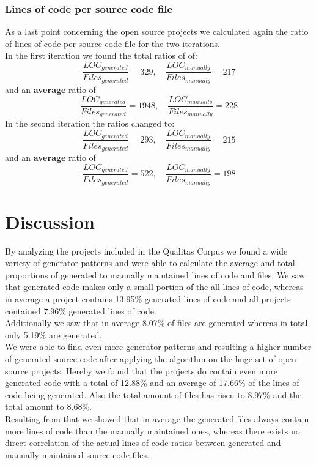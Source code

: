 \subsubsection{Lines of code per source code file}
As a last point concerning the open source projects we calculated again the ratio of lines of code per source code file for the two iterations.\\
In the first iteration we found the total ratios of of:
\begin{equation}
	\frac{LOC_{generated}}{Files_{generated}} = 329 , \quad \frac{LOC_{manually}}{Files_{manually}} = 217
\end{equation}
and an \textbf{average} ratio of
\begin{equation}
	\frac{LOC_{generated}}{Files_{generated}} = 1948 , \quad \frac{LOC_{manually}}{Files_{manually}} = 228
\end{equation}
In the second iteration the ratios changed to:
\begin{equation}
\frac{LOC_{generated}}{Files_{generated}} = 293 , \quad \frac{LOC_{manually}}{Files_{manually}} = 215
\end{equation}
and an \textbf{average} ratio of
\begin{equation}
\frac{LOC_{generated}}{Files_{generated}} = 522 , \quad \frac{LOC_{manually}}{Files_{manually}} = 198
\end{equation}

\section{Discussion}
By analyzing the projects included in the Qualitas Corpus we found a wide variety of generator-patterns and were able to calculate the average and total proportions of generated to manually maintained lines of code and files. We saw that generated code makes only a small portion of the all lines of code, whereas in average a project contains 13.95\% generated lines of code and all projects contained 7.96\% generated lines of code.\\
Additionally we saw that in average 8.07\% of files are generated whereas in total only 5.19\% are generated.\\
We were able to find even more generator-patterns and resulting a higher number of generated source code after applying the algorithm on the huge set of open source projects. Hereby we found that the projects do contain even more generated code with a total of 12.88\% and an average of 17.66\% of the lines of code being generated. Also the total amount of files has risen to 8.97\% and the total amount to 8.68\%.\\
Resulting from that we showed that in average the generated files always contain more lines of code than the manually maintained ones, whereas there exists no direct correlation of the actual lines of code ratios between generated and manually maintained source code files.

